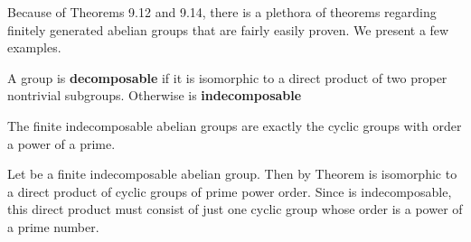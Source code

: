 \documentclass[11pt,oneside]{article}
\begin{document}
\begin{BookBody}

\noindent Because of Theorems 9.12 and 9.14, there is a plethora of theorems regarding finitely generated abelian groups that are fairly easily proven. We present a few examples.

 A group  is\textbf{ decomposable} if it is isomorphic to a direct product of two proper nontrivial subgroups. Otherwise  is\textbf{ indecomposable}\BookEnd{\blacksquare}

 The finite indecomposable abelian groups are exactly the cyclic groups with order a power of a prime.

 Let  be a finite indecomposable abelian group. Then by Theorem  is isomorphic to a direct product of cyclic groups of prime power order. Since  is indecomposable, this direct product must consist of just one cyclic group whose order is a power of a prime number.

\end{BookBody}

\BookNarrativetrue
\end{document}

